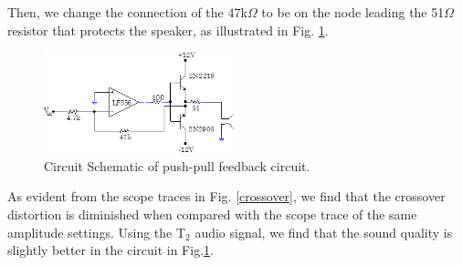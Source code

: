 \documentclass[authoryear, 12pt,5p, times]{elsarticle}
\begin{document}
 \par Then, we change the connection of the 47k$\Omega$ to be on the node leading the 51$\Omega$ resistor that protects the speaker, as illustrated in Fig. \ref{8_9_schema2}.
 \begin{figure}[h!]
 \centering
  \includegraphics[width=0.5\textwidth]{figure/8_9_schema2.png}
\caption{Circuit Schematic of push-pull feedback circuit.}
\label{8_9_schema2}
 \end{figure}
\par As evident from the scope traces in Fig. \ref{crossover}, we find that the crossover distortion is diminished when compared with the scope trace of the same amplitude settings. Using the T$_2$ audio signal, we find that the sound quality is slightly better in the circuit in Fig.\ref{8_9_schema2}.
\end{document}
